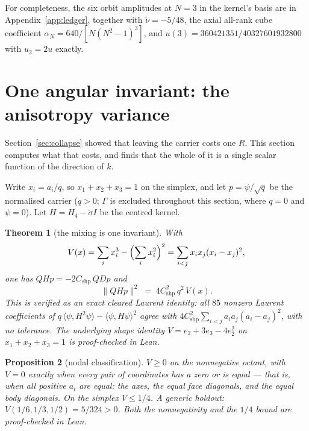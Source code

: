 \documentclass[11pt]{article}
\newtheorem{theorem}{Theorem}[section]
\newtheorem{proposition}[theorem]{Proposition}
\theoremstyle{definition}
\theoremstyle{remark}
\newcommand{\chk}[1]{}
\begin{document}
For completeness, the six orbit amplitudes at $N=3$ in the kernel's basis are
in Appendix~\ref{app:ledger}, together with $\tilde\nu=-5/48$, the axial
all-rank cube coefficient $\alpha_N=640/[N(N^2-1)^3]$, and
$u(3)=360421351/40327601932800$ with $u_2=2u$ exactly.

\section{One angular invariant: the anisotropy variance}\label{sec:aniso}

Section~\ref{sec:collapse} showed that leaving the carrier costs one $R$.
This section computes what that costs, and finds that the whole of it is a
single scalar function of the direction of $k$.

Write $x_i=a_i/q$, so $x_1+x_2+x_3=1$ on the simplex, and let $p=\psi/\sqrt q$
be the normalised carrier ($q>0$; $\Gamma$ is excluded throughout this
section, where $q=0$ and $\psi=0$). Let $H=H_4-\tilde\sigma I$ be the centred
kernel.

\begin{theorem}[the mixing is one invariant]\label{thm:aniso}
With
\[
  V(x)=\sum_i x_i^3-\Bigl(\sum_i x_i^2\Bigr)^{2}
      =\sum_{i<j}x_ix_j(x_i-x_j)^2 ,
\]
one has $QHp=-2C_{\mathrm{shp}}\,QDp$ and
\begin{equation}\label{eq:aniso}
  \bigl\|QHp\bigr\|^2 \;=\; 4C_{\mathrm{shp}}^2\,q^2\,V(x) .
\end{equation}
This is verified as an exact cleared Laurent identity: all $85$ nonzero
Laurent coefficients of $q\,\langle\psi,H^2\psi\rangle-\langle\psi,H\psi\rangle^2$
agree with $4C_{\mathrm{shp}}^2\sum_{i<j}a_ia_j(a_i-a_j)^2$, with no
tolerance. The underlying shape identity $V=e_2+3e_3-4e_2^2$ on
$x_1+x_2+x_3=1$ is proof-checked in Lean.\chk{anisotropy mixing residual matches the full assembled Laurent kernel}
\end{theorem}

\begin{proposition}[nodal classification]\label{prop:nodal}
$V\ge0$ on the nonnegative octant, with $V=0$ exactly when every pair of
coordinates has a zero or is equal --- that is, when all positive $a_i$ are
equal: the axes, the equal face diagonals, and the equal body diagonals. On
the simplex $V\le1/4$. A generic holdout: $V(1/6,1/3,1/2)=5/324>0$. Both the
nonnegativity and the $1/4$ bound are proof-checked in Lean.\chk{anisotropy variance is exactly the simplex pair sum and cubic shape invariant}
\end{proposition}
\end{document}
